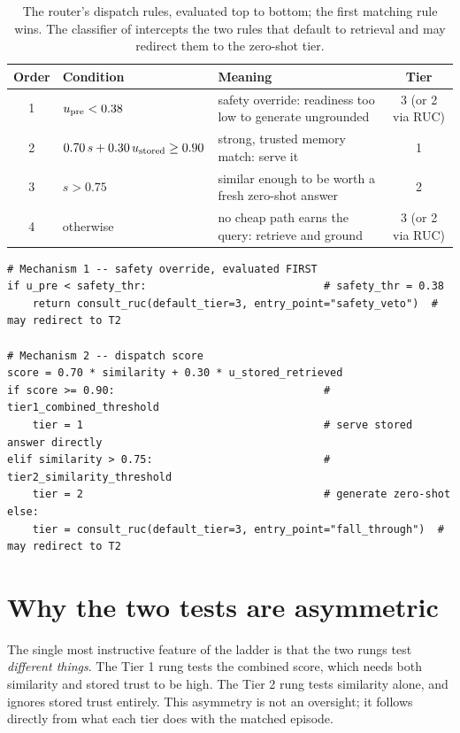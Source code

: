 \begin{table}[htbp]
\centering
\caption[Dispatch rules in order of evaluation]{The router's dispatch rules,
evaluated top to bottom; the first matching rule wins. The classifier of
 intercepts the two rules that default to retrieval and may redirect
them to the zero-shot tier.}
\label{tab:dispatch}
\small
\renewcommand{\arraystretch}{1.25}
\begin{tabularx}{\textwidth}{@{}c l >{\raggedright\arraybackslash}X c@{}}
\toprule
\textbf{Order} & \textbf{Condition} & \textbf{Meaning} & \textbf{Tier} \\
\midrule
1 & $u_{\text{pre}} < 0.38$ & safety override: readiness too low to generate ungrounded
  & 3 (or 2 via RUC) \\
2 & $0.70\,s + 0.30\,u_{\text{stored}} \ge 0.90$ & strong, trusted memory match: serve it
  & 1 \\
3 & $s > 0.75$ & similar enough to be worth a fresh zero-shot answer & 2 \\
4 & otherwise & no cheap path earns the query: retrieve and ground
  & 3 (or 2 via RUC) \\
\bottomrule
\end{tabularx}
\end{table}

\begin{lstlisting}[caption={The dispatch logic, condensed from \texttt{caem/routing/router.py}.}, label={lst:route}]
# Mechanism 1 -- safety override, evaluated FIRST
if u_pre < safety_thr:                            # safety_thr = 0.38
    return consult_ruc(default_tier=3, entry_point="safety_veto")  # may redirect to T2

# Mechanism 2 -- dispatch score
score = 0.70 * similarity + 0.30 * u_stored_retrieved
if score >= 0.90:                                 # tier1_combined_threshold
    tier = 1                                      # serve stored answer directly
elif similarity > 0.75:                           # tier2_similarity_threshold
    tier = 2                                      # generate zero-shot
else:
    tier = consult_ruc(default_tier=3, entry_point="fall_through")  # may redirect to T2
\end{lstlisting}

\section{Why the two tests are asymmetric}
\label{sec:router-asymmetry}

The single most instructive feature of the ladder is that the two rungs test
\emph{different things}. The Tier 1 rung tests the combined score, which needs both
similarity and stored trust to be high. The Tier 2 rung tests similarity alone, and
ignores stored trust entirely. This asymmetry is not an oversight; it follows
directly from what each tier does with the matched episode.


